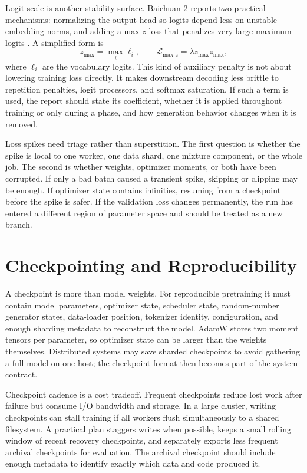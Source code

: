 Logit scale is another stability surface. Baichuan 2 reports two practical mechanisms: normalizing the output head so logits depend less on unstable embedding norms, and adding a max-$z$ loss that penalizes very large maximum logits \cite{yang2023baichuan2}. A simplified form is
\[
  z_{\max} = \max_i \ell_i,
  \qquad
  \mathcal{L}_{\text{max-}z} = \lambda z_{\max} z_{\max},
\]
where $\ell_i$ are the vocabulary logits. This kind of auxiliary penalty is not about lowering training loss directly. It makes downstream decoding less brittle to repetition penalties, logit processors, and softmax saturation. If such a term is used, the report should state its coefficient, whether it is applied throughout training or only during a phase, and how generation behavior changes when it is removed.

Loss spikes need triage rather than superstition. The first question is whether the spike is local to one worker, one data shard, one mixture component, or the whole job. The second is whether weights, optimizer moments, or both have been corrupted. If only a bad batch caused a transient spike, skipping or clipping may be enough. If optimizer state contains infinities, resuming from a checkpoint before the spike is safer. If the validation loss changes permanently, the run has entered a different region of parameter space and should be treated as a new branch.

\section{Checkpointing and Reproducibility}
\label{sec:checkpointing-reproducibility}

A checkpoint is more than model weights. For reproducible pretraining it must contain model parameters, optimizer state, scheduler state, random-number generator states, data-loader position, tokenizer identity, configuration, and enough sharding metadata to reconstruct the model. AdamW stores two moment tensors per parameter, so optimizer state can be larger than the weights themselves. Distributed systems may save sharded checkpoints to avoid gathering a full model on one host; the checkpoint format then becomes part of the system contract.

Checkpoint cadence is a cost tradeoff. Frequent checkpoints reduce lost work after failure but consume I/O bandwidth and storage. In a large cluster, writing checkpoints can stall training if all workers flush simultaneously to a shared filesystem. A practical plan staggers writes when possible, keeps a small rolling window of recent recovery checkpoints, and separately exports less frequent archival checkpoints for evaluation. The archival checkpoint should include enough metadata to identify exactly which data and code produced it.


